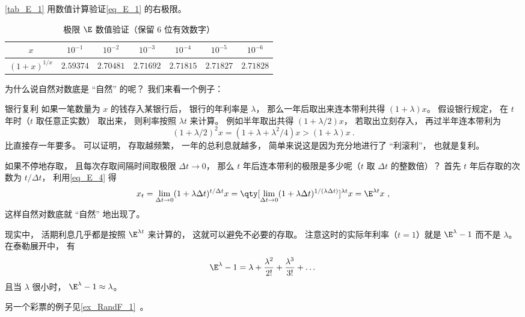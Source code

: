 \autoref{tab_E_1} 用数值计算验证\autoref{eq_E_1} 的右极限。
\begin{table}[ht]
\centering
\caption{极限 $\E$ 数值验证（保留 6 位有效数字）}\label{tab_E_1}
\begin{tabular}{|c|c|c|c|c|c|c|}
\hline
$x$ & $10^{-1}$ & $10^{-2}$ & $10^{-3}$ & $10^{-4}$ & $10^{-5}$ & $10^{-6}$ \\
\hline
$(1 + x)^{1/x}$ & $2.59374$ & $2.70481$ & $2.71692$ & $2.71815$ & $2.71827$ & $2.71828$ \\
\hline
\end{tabular}
\end{table}

为什么说自然对数底是 “自然” 的呢？ 我们来看一个例子：

\begin{example}{银行复利}
如果一笔数量为 $x$ 的钱存入某银行后， 银行的年利率是 $\lambda$， 那么一年后取出来连本带利共得 $(1+\lambda)x$。 假设银行规定， 在 $t$ 年时（$t$ 取任意正实数） 取出来， 则利率按照 $\lambda t$ 来计算。 例如半年取出共得 $(1+\lambda/2)x$， 若取出立刻存入， 再过半年连本带利为
\begin{equation}
(1+\lambda/2)^2 x = (1 + \lambda + \lambda^2/4)x > (1 + \lambda) x~.
\end{equation}
比直接存一年要多。 可以证明， 存取越频繁， 一年的总利息就越多， 简单来说这是因为充分地进行了 “利滚利”， 也就是复利。

如果不停地存取， 且每次存取间隔时间取极限 $\Delta t \to 0$， 那么 $t$ 年后连本带利的极限是多少呢（$t$ 取 $\Delta t$ 的整数倍）？ 首先 $t$ 年后存取的次数为 $t/\Delta t$， 利用\autoref{eq_E_4} 得
\begin{equation}
x_t = \lim_{\Delta t\to 0}(1 + \lambda \Delta t)^{t/\Delta t} x
= \qty[\lim_{\Delta t\to 0}(1 + \lambda \Delta t)^{1/(\lambda \Delta t)}]^{\lambda t} x
= \E^{\lambda t} x~,
\end{equation}
这样自然对数底就 “自然” 地出现了。

现实中， 活期利息几乎都是按照 $\E^{\lambda t}$ 来计算的， 这就可以避免不必要的存取。 注意这时的实际年利率（$t = 1$）就是 $\E^\lambda - 1$ 而不是 $\lambda$。 在泰勒展开中， 有
\begin{equation}
\E^\lambda - 1 = \lambda + \frac{\lambda^2}{2!} + \frac{\lambda^3}{3!} + \dots
\end{equation}
且当 $\lambda$ 很小时， $\E^\lambda - 1 \approx \lambda$。
\end{example}

另一个彩票的例子见\autoref{ex_RandF_1}~。
